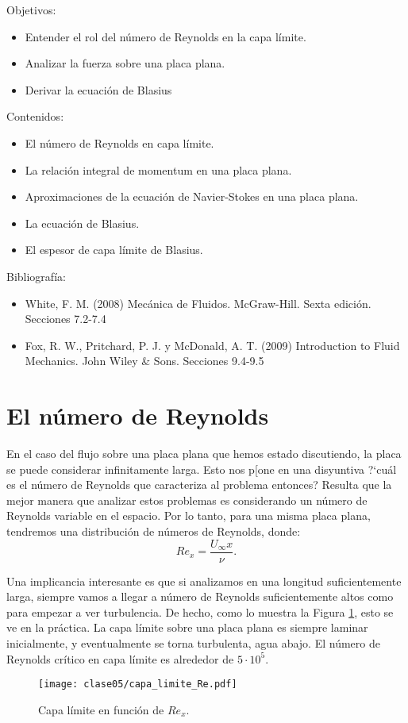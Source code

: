 \begin{framed}

Objetivos:
\begin{itemize}
    \item Entender el rol del número de Reynolds en la capa límite.
    \item Analizar la fuerza sobre una placa plana.
    \item Derivar la ecuación de Blasius
\end{itemize}

Contenidos:
\begin{itemize}
    \item El número de Reynolds en capa límite.
    \item La relación integral de momentum en una placa plana.
    \item Aproximaciones de la ecuación de Navier-Stokes en una placa plana.
    \item La ecuación de Blasius.
    \item El espesor de capa límite de Blasius.
\end{itemize}

Bibliografía:
\begin{itemize}
    \item White, F. M. (2008) Mecánica de Fluidos. McGraw-Hill. Sexta edición. Secciones 7.2-7.4
    \item Fox, R. W., Pritchard, P. J. y McDonald, A. T. (2009) Introduction to Fluid Mechanics. John Wiley \& Sons. Secciones 9.4-9.5
\end{itemize}
\end{framed}

\section*{El número de Reynolds}

En el caso del flujo sobre una placa plana que hemos estado discutiendo, la placa se puede considerar infinitamente larga.
Esto nos p[one en una disyuntiva \mbox{?`}cuál es el número de Reynolds que caracteriza al problema entonces?
Resulta que la mejor manera que analizar estos problemas es considerando un número de Reynolds variable en el espacio.
Por lo tanto, para una misma placa plana, tendremos una distribución de números de Reynolds, donde:
%
\begin{equation}\label{eq:Re_capa}
Re_x = \frac{U_\infty x}{\nu}.
\end{equation}

Una implicancia interesante es que si analizamos en una longitud suficientemente larga, siempre vamos a llegar a número de Reynolds suficientemente altos como para empezar a ver turbulencia.
De hecho, como lo muestra la Figura \ref{fig:capa_limite_Re}, esto se ve en la práctica. 
La capa límite sobre una placa plana es siempre laminar inicialmente, y eventualmente se torna turbulenta, agua abajo.
El número de Reynolds crítico en capa límite es alrededor de $5\cdot10^{5}$.
%
\begin{figure}[!h]
\centering
\texttt{[image: clase05/capa\_limite\_Re.pdf]}
\caption{Capa límite en función de $Re_x$.}
\label{fig:capa_limite_Re}
\end{figure}

